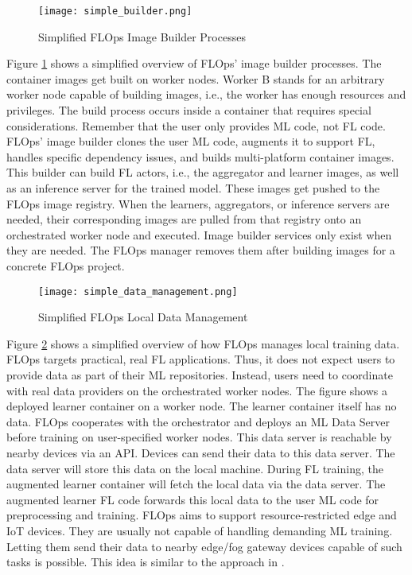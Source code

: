 \begin{figure}[h]
    \centering
    \texttt{[image: simple\_builder.png]}
    \caption{Simplified FLOps Image Builder Processes}
    \label{fig:flops_simple_image_builder}
\end{figure}

Figure \ref{fig:flops_simple_image_builder} shows a simplified overview of FLOps' image builder processes.
The container images get built on worker nodes.
Worker B stands for an arbitrary worker node capable of building images, i.e., the worker has enough resources and privileges.
The build process occurs inside a container that requires special considerations.
Remember that the user only provides ML code, not FL code.
FLOps' image builder clones the user ML code, augments it to support FL, handles specific dependency issues, and builds multi-platform container images.
This builder can build FL actors, i.e., the aggregator and learner images, as well as an inference server for the trained model.
These images get pushed to the FLOps image registry.
When the learners, aggregators, or inference servers are needed, their corresponding images are pulled from that registry onto an orchestrated worker node and executed.
Image builder services only exist when they are needed.
The FLOps manager removes them after building images for a concrete FLOps project.

\begin{figure}[h]
    \begin{adjustwidth}{-0.1\paperwidth}{-0.1\paperwidth}
        \centering
        \texttt{[image: simple\_data\_management.png]}
        \caption{Simplified FLOps Local Data Management}
        \label{fig:flops_simple_data_management}
    \end{adjustwidth}
\end{figure}

Figure \ref{fig:flops_simple_data_management} shows a simplified overview of how FLOps manages local training data.
FLOps targets practical, real FL applications.
Thus, it does not expect users to provide data as part of their ML repositories.
Instead, users need to coordinate with real data providers on the orchestrated worker nodes.
The figure shows a deployed learner container on a worker node.
The learner container itself has no data. 
FLOps cooperates with the orchestrator and deploys an ML Data Server before training on user-specified worker nodes.
This data server is reachable by nearby devices via an API.
Devices can send their data to this data server.
The data server will store this data on the local machine.
During FL training, the augmented learner container will fetch the local data via the data server.
The augmented learner FL code forwards this local data to the user ML code for preprocessing and training.
FLOps aims to support resource-restricted edge and IoT devices.
They are usually not capable of handling demanding ML training.
Letting them send their data to nearby edge/fog gateway devices capable of such tasks is possible.
This idea is similar to the approach in \cite{paper:global_fl_platform_for_iot}.


